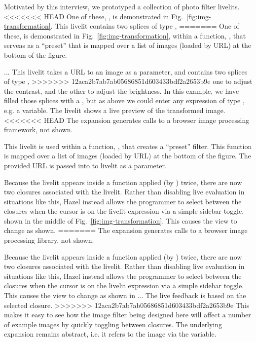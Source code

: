 
Motivated by this interview,
we prototyped a collection of photo filter livelits.
<<<<<<< HEAD
One of these, , is demonstrated in Fig.~\ref{fig:img-transformation}. 
This livelit contains two splices of type ,
=======
One of these,  is demonstrated in Fig.~\ref{fig:img-transformation},
within a function, , that serveas as a ``preset'' that is
mapped over a list of images (loaded by URL) at the bottom of the figure.

...
This livelit takes
a URL to an image as a parameter, and contains two splices of type ,
>>>>>>> 12aca2b7ab7ab05686851d603433bdf2a2653b9e
one to adjust the contrast, and the other to adjust the brightness.
In this example, we have filled those splices with a , but
as above we could enter any expression of type , e.g. a variable.
The livelit shows a live preview of the transformed image.
<<<<<<< HEAD
The expansion generates calls to a browser image processing framework, 
not shown.

This livelit is used within a function, , that creates a ``preset'' filter. 
This function is mapped over a list of images (loaded by URL) at the bottom of the figure. 
The provided URL is passed into to livelit as a parameter.

Because the livelit appears inside a function applied (by ) twice, 
there are now two closures associated with the livelit. 
Rather than disabling live evaluation in situations like 
this, Hazel instead allows the programmer to select between the closures when 
the cursor is on the livelit expression via a simple sidebar toggle,
shown in the middle of Fig.~\ref{fig:img-transformation}.
This causes the view to change as shown. 
=======
The expansion generates calls to a browser image processing library,
not shown.

Because the livelit appears inside a function applied (by ) twice,
there are now two closures associated with the livelit.
Rather than disabling live evaluation in situations like
this, Hazel instead allows the programmer to select between the closures when
the cursor is on the livelit expression via a simple sidebar toggle.
This causes the view to change as shown in ...
The live feedback is based on the selected closure.
>>>>>>> 12aca2b7ab7ab05686851d603433bdf2a2653b9e
This makes it easy to see how the image filter being designed here will affect a
number of example images by quickly toggling between closures.
The underlying expansion remains abstract, i.e. it refers to the image via the  variable.

